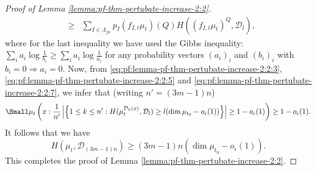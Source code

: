 \documentclass[a4paper,11pt]{amsart}
\theoremstyle{definition}
\numberwithin{equation}{section}
\def\D{\mathcal{D}}
\begin{document}
\begin{proof}[Proof of Lemma \ref{lemma:pf-thm-pertubate-increase-2:2}]
\begin{eqnarray}
& \ge &  \sum_{I\in \Lambda_{jn}}p_I(f_{I,t}\mu_t)(Q) H\left((f_{I,t}\mu_t)^{Q},\D_l\right),  \label{eq:pf:lemma-pf-thm-pertubate-increase-2:2:7}
\end{eqnarray}
where for the last inequality we have used the Gibbs inequality: $\sum_i a_i\log \frac{1}{b_i}\ge \sum_i a_i\log \frac{1}{a_i}$ for any probability vectors $(a_i)_i$ and $(b_i)_i$ with $b_i=0\Rightarrow a_i=0$.  
Now,  from  \eqref{eq:pf:lemma-pf-thm-pertubate-increase-2:2:3},  \eqref{eq:pf:lemma-pf-thm-pertubate-increase-2:2:5} and \eqref{eq:pf:lemma-pf-thm-pertubate-increase-2:2:7},  we infer that (writing $n'=(3m-1)n$)
\begin{equation}\label{eq:pf:lemma-pf-thm-pertubate-increase-2:2:8}
{\Small
\mu_{t} \left( x:\frac{1}{n'}\left| \left\{ 1\le k \le  n': H(\mu_{t}^{\D_k(x)},\D_l)\ge l(\dim\mu_{t_0}  -o_ \epsilon(1)) \right\} \right| \ge 1-o_{\epsilon}(1) \right) \ge 1-o_{\epsilon}(1).
}
\end{equation}
It follows that we have
\[
H(\mu_t,\D_{(3m-1)n}) \ge (3m-1)n(\dim\mu_{t_0}  -o_ \epsilon(1)).
\]
This completes the proof of Lemma \ref{lemma:pf-thm-pertubate-increase-2:2}.
\end{proof}
\end{document}
